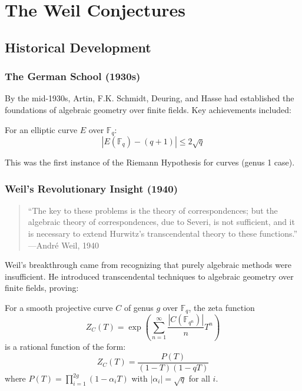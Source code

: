 \section{The Weil Conjectures}
\label{sec:weil_conjectures}

\subsection{Historical Development}

\subsubsection{The German School (1930s)}

By the mid-1930s, Artin, F.K. Schmidt, Deuring, and Hasse had established the foundations of algebraic geometry over finite fields. Key achievements included:

\begin{theorem}[Hasse, 1936]
For an elliptic curve $E$ over $\mathbb{F}_q$:
\begin{equation}
|E(\mathbb{F}_q) - (q+1)| \leq 2\sqrt{q}
\end{equation}
\end{theorem}

This was the first instance of the Riemann Hypothesis for curves (genus 1 case).

\subsubsection{Weil's Revolutionary Insight (1940)}

\begin{quote}
``The key to these problems is the theory of correspondences; but the algebraic theory of correspondences, due to Severi, is not sufficient, and it is necessary to extend Hurwitz's transcendental theory to these functions.'' —André Weil, 1940
\end{quote}

Weil's breakthrough came from recognizing that purely algebraic methods were insufficient. He introduced transcendental techniques to algebraic geometry over finite fields, proving:

\begin{theorem}[Weil, 1941]
\label{thm:weil_curves}
For a smooth projective curve $C$ of genus $g$ over $\mathbb{F}_q$, the zeta function
\begin{equation}
Z_C(T) = \exp\left(\sum_{n=1}^{\infty} \frac{|C(\mathbb{F}_{q^n})|}{n} T^n\right)
\end{equation}
is a rational function of the form:
\begin{equation}
Z_C(T) = \frac{P(T)}{(1-T)(1-qT)}
\end{equation}
where $P(T) = \prod_{i=1}^{2g}(1-\alpha_i T)$ with $|\alpha_i| = \sqrt{q}$ for all $i$.
\end{theorem}

